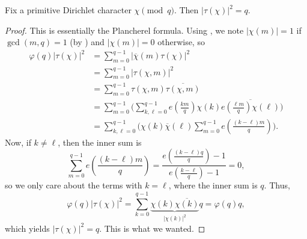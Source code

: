 \documentclass[../notes.tex]{subfiles}
\begin{document}
\begin{proposition} \label{prop:mag-of-gauss-sum}
	Fix a primitive Dirichlet character $\chi\pmod q$. Then $|\tau(\chi)|^2=q$.
\end{proposition}
\begin{proof}
	This is essentially the Plancherel formula. Using , we note $|\chi(m)|=1$ if $\gcd(m,q)=1$ (by ) and $|\chi(m)|=0$ otherwise, so
	\begin{align*}
		\varphi(q)|\tau(\chi)|^2 &= \sum_{m=0}^{q-1}|\overline\chi(m)\tau(\chi)|^2 \\
		&= \sum_{m=0}^{q-1}|\tau(\chi,m)|^2 \\
		&= \sum_{m=0}^{q-1}\tau(\chi,m)\overline{\tau(\chi,m)} \\
		&= \sum_{m=0}^{q-1}\Bigg(\sum_{k,\ell=0}^{q-1}e\left(\frac{km}q\right)\chi(k)\overline{e\left(\frac{\ell m}q\right)\chi(\ell)}\Bigg) \\
		&= \sum_{k,\ell=0}^{q-1}\Bigg(\chi(k)\overline\chi(\ell)\sum_{m=0}^{q-1}e\left(\frac{(k-\ell)m}q\right)\Bigg).
	\end{align*}
	Now, if $k\ne\ell$, then the inner sum is
	\[\sum_{m=0}^{q-1}e\left(\frac{(k-\ell)m}q\right)=\frac{e\left(\frac{(k-\ell)q}q\right)-1}{e\left(\frac{k-\ell}q\right)-1}=0,\]
	so we only care about the terms with $k=\ell$, where the inner sum is $q$. Thus,
	\[\varphi(q)|\tau(\chi)|^2=\sum_{k=0}^{q-1}\underbrace{\chi(k)\overline{\chi(k)}}_{|\chi(k)|^2}q=\varphi(q)q,\]
	which yields $|\tau(\chi)|^2=q$. This is what we wanted.
\end{proof}
\end{document}
